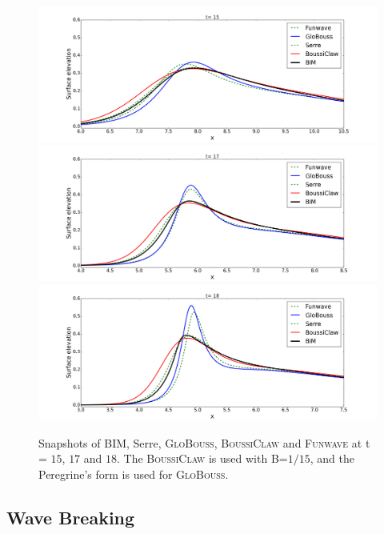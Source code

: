 \documentclass[review]{elsarticle}
\begin{document}
\begin{figure}[!htb]
\centering
\includegraphics[width=.9\textwidth]{_fig/bim_dgeo_fun_glob_150.png}\\
\includegraphics[width=.9\textwidth]{_fig/bim_dgeo_fun_glob_170.png}\\
\includegraphics[width=.9\textwidth]{_fig/bim_dgeo_fun_glob_180.png}
\caption{Snapshots of BIM, Serre, \textsc{GloBouss}, \textsc{BoussiClaw}
and \textsc{Funwave} at t = $15$, $17$ and $18$.
The \textsc{BoussiClaw} is used with B=$1/15$,
and the Peregrine's form is used for \textsc{GloBouss}.}
\label{fig:bim_dgeo_fun}
\end{figure}

\subsection{Wave Breaking}
\end{document}
